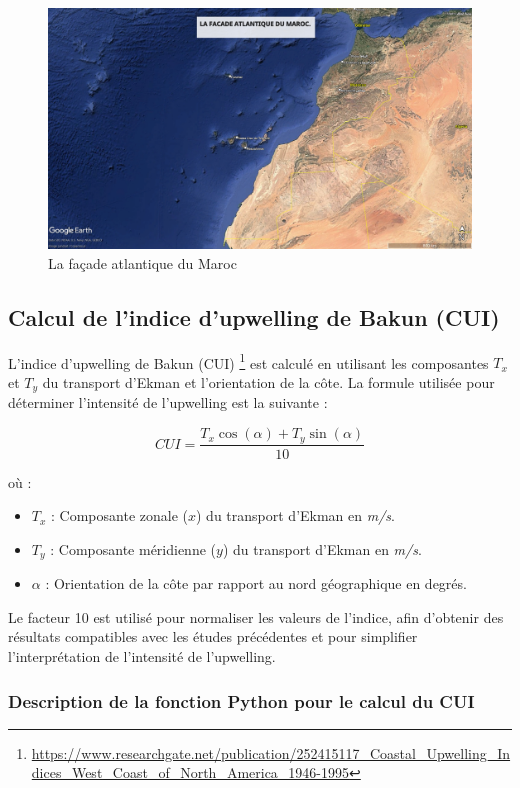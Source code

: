 \begin{figure}[H]
\centering
\includegraphics[scale=0.2]{zone.jpg}
\caption{La façade atlantique du Maroc}
\end{figure}




\subsection{Calcul de l'indice d'upwelling de Bakun (CUI)}

L'indice d'upwelling de Bakun (CUI) \footnote{\url{https://www.researchgate.net/publication/252415117_Coastal_Upwelling_Indices_West_Coast_of_North_America_1946-1995}} est calculé en utilisant les composantes $T_x$ et $T_y$ du transport d'Ekman et l'orientation de la côte. La formule utilisée pour déterminer l'intensité de l'upwelling est la suivante :

\[
CUI = \frac{T_x \cos(\alpha) + T_y \sin(\alpha)}{10}
\]

où :
\begin{itemize}
    \item $T_x$ : Composante zonale ($x$) du transport d'Ekman en \textit{m/s}.
    \item $T_y$ : Composante méridienne ($y$) du transport d'Ekman en \textit{m/s}.
    \item $\alpha$ : Orientation de la côte par rapport au nord géographique en degrés.
\end{itemize}

Le facteur 10 est utilisé pour normaliser les valeurs de l'indice, afin d'obtenir des résultats compatibles avec les études précédentes et pour simplifier l'interprétation de l'intensité de l'upwelling. 

\subsubsection{Description de la fonction Python pour le calcul du CUI}

